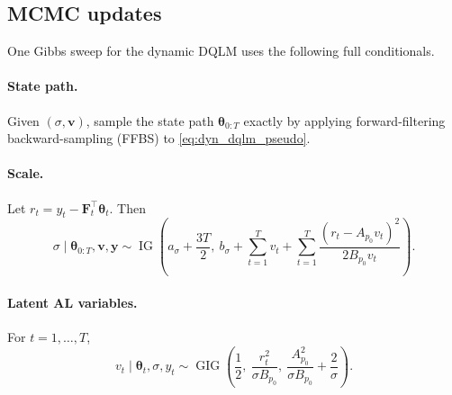 \documentclass[nojss,noheadings]{jss}
\newcommand{\vect}[1]{\bm{#1}}
\newcommand{\mat}[1]{\mathbf{#1}}
\newcommand{\IG}{\operatorname{IG}}
\newcommand{\GIG}{\operatorname{GIG}}
\begin{document}
\subsection{MCMC updates}

One Gibbs sweep for the dynamic DQLM uses the following full conditionals.

\paragraph{State path.}
Given $(\sigma,\vect{v})$, sample the state path
$\vect{\theta}_{0:T}$ exactly by applying forward-filtering
backward-sampling (FFBS) to \eqref{eq:dyn_dqlm_pseudo}.

\paragraph{Scale.}
Let $r_t=y_t-\mat{F}_t^\top\vect{\theta}_t$. Then
\begin{equation}
\sigma\mid \vect{\theta}_{0:T},\vect{v},\vect{y}
\sim \IG\left(
a_\sigma+\frac{3T}{2},\
b_\sigma+\sum_{t=1}^T v_t+
\sum_{t=1}^T\frac{(r_t-A_{p_0}v_t)^2}{2B_{p_0}v_t}
\right).
\label{eq:dyn_dqlm_sigma_cond}
\end{equation}

\paragraph{Latent AL variables.}
For $t=1,\ldots,T$,
\begin{equation}
v_t\mid\vect{\theta}_t,\sigma,y_t
\sim
\GIG\left(
\frac{1}{2},\
\frac{r_t^2}{\sigma B_{p_0}},\
\frac{A_{p_0}^2}{\sigma B_{p_0}}+\frac{2}{\sigma}
\right).
\label{eq:dyn_dqlm_v_cond}
\end{equation}
\end{document}
